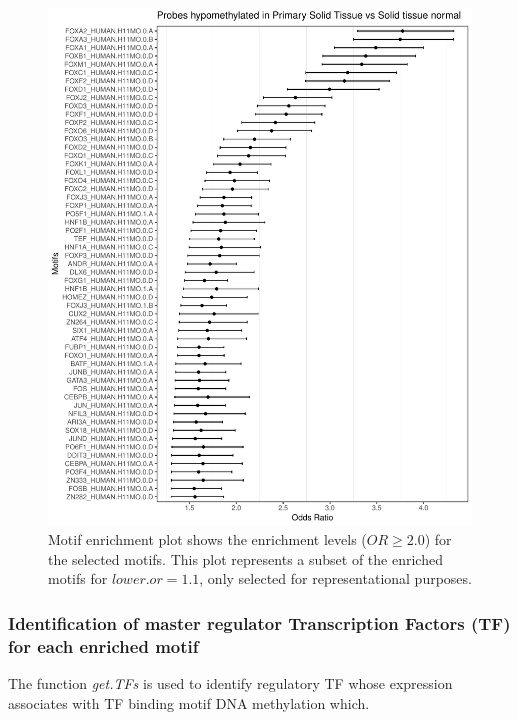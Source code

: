 

\begin{figure}
\centering
\includegraphics[width=1.0\textwidth]{images/OR_nosummary.pdf}
\caption[Motif enrichment plot]{\label{fig:boxplot2} Motif enrichment plot shows the enrichment levels ($OR\geq2.0$) for the selected motifs. This plot represents a subset of the enriched motifs for $\textit{lower.or}= 1.1$, only selected for representational purposes.}
\end{figure}

\subsubsection*{Identification of master regulator Transcription Factors (TF) for each enriched motif}
The function \textit{get.TFs} is used to identify regulatory TF whose expression associates with TF binding motif
DNA methylation which.

